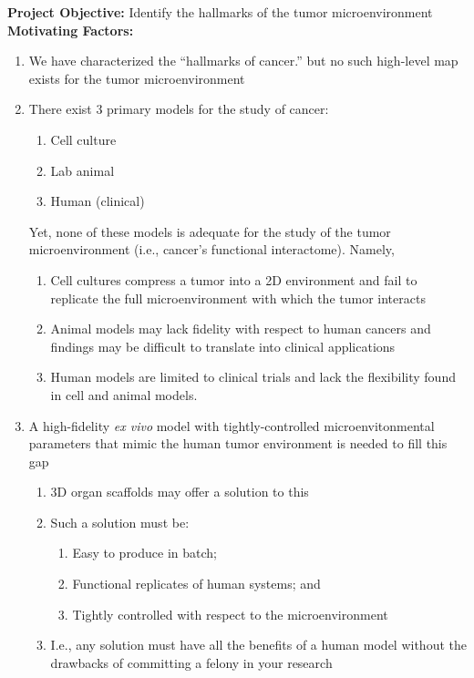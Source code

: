 \documentclass[11pt,letterpaper,final] {article}
\begin{document}

{\bfseries Project Objective:} Identify the hallmarks of the tumor microenvironment\\[0.4cm]

{\bfseries Motivating Factors:}
\begin{enumerate}
	\item We have characterized the ``hallmarks of cancer.'' but no such high-level map exists for the tumor microenvironment
	\item There exist 3 primary models for the study of cancer:
		\begin{enumerate}
			\item Cell culture
			\item Lab animal
			\item Human (clinical)
		\end{enumerate}
	Yet, none of these models is adequate for the study of the tumor microenvironment (i.e., cancer's functional interactome). Namely,
		\begin{enumerate}
			\item Cell cultures compress a tumor into a 2D environment and fail to replicate the full microenvironment with which the tumor interacts
			\item Animal models may lack fidelity with respect to human cancers and findings may be difficult to translate into clinical applications
			\item Human models are limited to clinical trials and lack the flexibility found in cell and animal models.
		\end{enumerate}
	\item A high-fidelity {\itshape ex vivo} model with tightly-controlled microenvitonmental parameters that mimic the human tumor environment is needed to fill this gap
		\begin{enumerate}
			\item 3D organ scaffolds may offer a solution to this
			\item Such a solution must be:
				\begin{enumerate}
					\item Easy to produce in batch;
					\item Functional replicates of human systems; and
					\item Tightly controlled with respect to the microenvironment
				\end{enumerate}
			\item I.e., any solution must have all the benefits of a human model without the drawbacks of committing a felony in your research
		\end{enumerate}
\end{enumerate}
\end{document}
